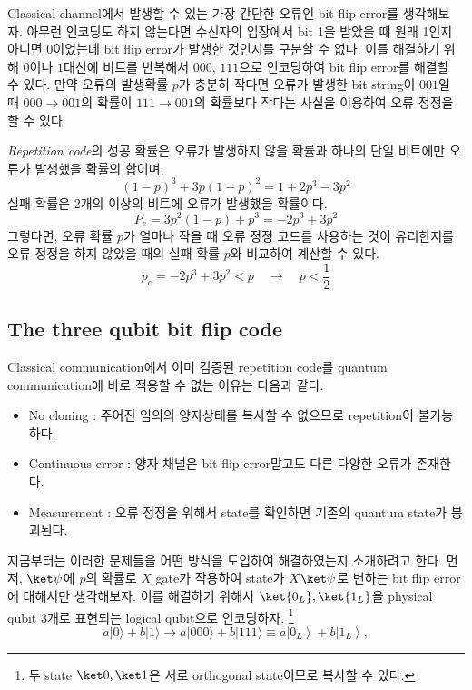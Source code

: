 Classical channel에서 발생할 수 있는 가장 간단한 오류인 bit flip error를 생각해보자. 아무런 인코딩도 하지 않는다면 수신자의 입장에서 bit 1을 받았을 때 원래 1인지 아니면 0이었는데 bit flip error가 발생한 것인지를 구분할 수 없다.
이를 해결하기 위해 $0$이나 $1$대신에 비트를 반복해서 $000$, $111$으로 인코딩하여 bit flip error를 해결할 수 있다. 만약 오류의 발생확률 $p$가 충분히 작다면 오류가 발생한 bit string이 $001$일 때 $000 \rightarrow 001$의 확률이 $111 \rightarrow 001$의 확률보다 작다는 사실을 이용하여 오류 정정을 할 수 있다. 

\textit{Repetition code}의 성공 확률은 오류가 발생하지 않을 확률과 하나의 단일 비트에만 오류가 발생했을 확률의 합이며,
\begin{equation*}
    (1-p)^3+3p(1-p)^2 = 1 + 2p^3 - 3p^2
\end{equation*}
실패 확률은 2개의 이상의 비트에 오류가 발생했을 확률이다.
\begin{equation*}
    P_e  = 3p^2(1-p) + p^3 = - 2p^3 + 3p^2 
\end{equation*}
그렇다면, 오류 확률 $p$가 얼마나 작을 때 오류 정정 코드를 사용하는 것이 유리한지를 오류 정정을 하지 않았을 때의 실패 확률 $p$와 비교하여 계산할 수 있다.
\begin{equation*}
    p_e = -2p^3 + 3p^2 < p \quad \rightarrow \quad p < \frac{1}{2}
\end{equation*}

\subsection{The three qubit bit flip code}
Classical communication에서 이미 검증된 repetition code를 quantum communication에 바로 적용할 수 없는 이유는 다음과 같다.
\begin{itemize}
    \item No cloning : 주어진 임의의 양자상태를 복사할 수 없으므로 repetition이 불가능하다.
    \item Continuous error : 양자 채널은 bit flip error말고도 다른 다양한 오류가 존재한다.
    \item Measurement : 오류 정정을 위해서 state를 확인하면 기존의 quantum state가 붕괴된다.
\end{itemize} 
지금부터는 이러한 문제들을 어떤 방식을 도입하여 해결하였는지 소개하려고 한다. 먼저, $\ket \psi$에 $p$의 확률로 $X$ gate가 작용하여 state가 $X \ket \psi$로 변하는 bit flip error에 대해서만 생각해보자.
이를 해결하기 위해서 $\ket{0_L}, \ket{1_L}$을 physical qubit 3개로 표현되는 logical qubit으로 인코딩하자. \footnote{두 state $\ket 0, \ket 1$은 서로 orthogonal state이므로 복사할 수 있다.}
\begin{equation*}
    a|0\rangle+b|1\rangle \rightarrow a|000\rangle+b|111\rangle \equiv a\left|0_L\right\rangle+b\left|1_L\right\rangle,
\end{equation*}

